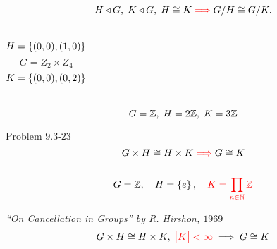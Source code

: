 
\begin{frame}

  \begin{center}
	\Large{}
  \end{center}
\end{frame}

\begin{frame}
  \begin{exampleblock}{}
    \[
      H \triangleleft G,\; K \triangleleft G,\; H \cong K \textcolor{red}{\implies} G/H \cong G/K.
    \]
  \end{exampleblock}

  \pause
  \vspace{0.50cm}

  \pause
  \vspace{-0.50cm}
  \begin{columns}
	  \[
		H = \left\{(0,0), (1,0)\right\}
	  \]
	  \vspace{-0.40cm}
	  \[
		G = Z_2 \times Z_4
	  \]
	  \[
		K = \left\{(0,0), (0,2)\right\}
	  \]
  \end{columns}

  \pause
  \vspace{0.50cm}
  \[
	G = \mathbb{Z},\; H = 2\mathbb{Z},\; K = 3\mathbb{Z}
  \]
\end{frame}

\begin{frame}
  \begin{exampleblock}{Problem $9.3$-$23$}
	\[
	  G \times H \cong H \times K \textcolor{red}{\implies} G \cong K
	\]
  \end{exampleblock}

  \begin{columns}
	  \pause
	  \pause
  \end{columns}

  \pause
  \vspace{0.60cm}
  \[
	G = \mathbb{Z},\quad H = \left\{e\right\},\quad \textcolor{red}{K = \prod_{n \in \mathbb{N}} \mathbb{Z}}
  \]

  \pause
  \begin{alertblock}{\it ``On Cancellation in Groups'' by R. Hirshon, $1969$}
	\[
	  G \times H \cong H \times K,\; \textcolor{red}{\big\lvert K \big\rvert < \infty} \implies G \cong K
	\]
  \end{alertblock}
\end{frame}

